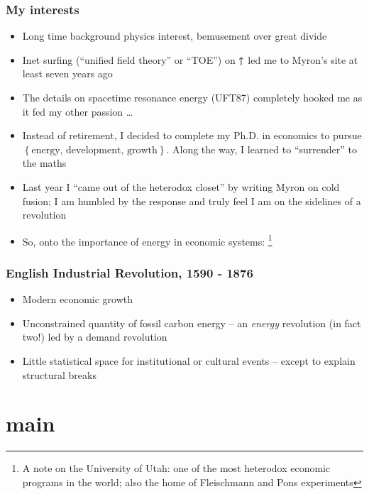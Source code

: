 \documentclass[final]{beamer}
\begin{document}
\begin{frame}
\frametitle{My interests}
\begin{itemize}
\item Long time background physics interest, bemusement over great divide \pause
\item Inet surfing (``unified field theory'' or ``TOE'') on $\bold{\uparrow}$ led me to Myron's site at least seven years ago \pause
\item The details on spacetime resonance energy (UFT87) completely hooked me as it fed my other passion \ldots \pause
\item Instead of retirement, I decided to complete my Ph.D. in economics to pursue $\left\lbrace \text{energy, development, growth}\right\rbrace$. \pause Along the way, I learned to ``surrender'' to the maths\pause
\item Last year I ``came out of the heterodox closet'' by writing Myron on cold fusion; I am humbled by the response and truly feel I am on the sidelines of a revolution\pause
\item So, onto the importance of energy in economic systems:
\footnote{A note on the University of Utah: one of the most heterodox economic programs in the world; also the home of Fleischmann and Pons experiments}
\end{itemize}
\end{frame}

\begin{frame}
\frametitle{English Industrial Revolution, 1590 - 1876}

	\begin{itemize}
	\item Modern economic growth
	\item Unconstrained quantity of fossil carbon energy -- an \textit{energy} revolution (in fact two!) led by a demand revolution
	\item Little statistical space for institutional or cultural events -- except to explain structural breaks
	\end{itemize}
\end{frame}

\section{main}
\end{document}
